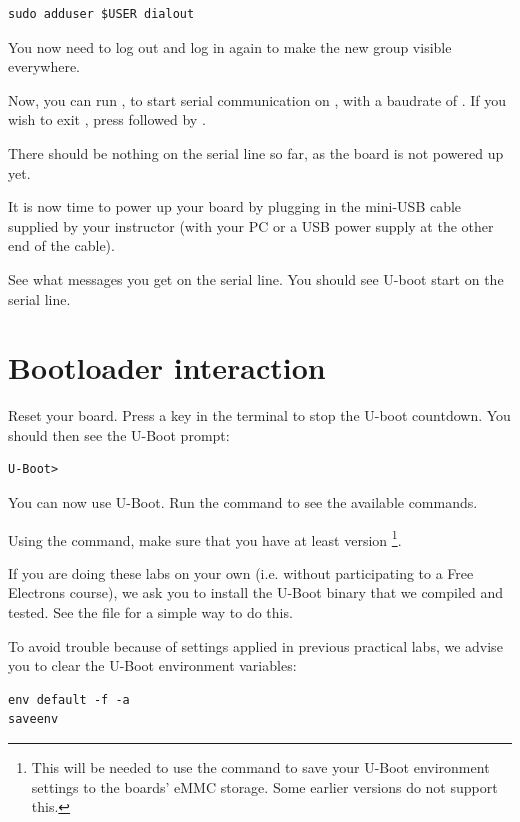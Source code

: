 \begin{verbatim}
sudo adduser $USER dialout
\end{verbatim}

You now need to log out and log in again to make the new group
visible everywhere.

Now, you can run , to start serial
communication on , with a baudrate of . If
you wish to exit , press \code{[Ctrl][a]} followed by
\code{[Ctrl][x]}.

There should be nothing on the serial line so far, as the board is not
powered up yet.

It is now time to power up your board by plugging in the mini-USB
cable supplied by your instructor (with your PC or a USB power supply at the
other end of the cable).

See what messages you get on the serial line. You should see U-boot
start on the serial line.

\section{Bootloader interaction}

Reset your board. Press a key in the  terminal to stop the U-boot
countdown. You should then see the U-Boot prompt:
\begin{verbatim}
U-Boot>
\end{verbatim}

You can now use U-Boot. Run the  command to see the available
commands.

Using the  command, make sure that you have at least version
\footnote{This will be needed to use the  command to
save your U-Boot environment settings to the boards' eMMC storage.
Some earlier versions do not support this.}.

If you are doing these labs on your own (i.e. without participating to a Free Electrons
course), we ask you to install the U-Boot binary that we compiled and
tested. See the 
file for a simple way to do this.

To avoid trouble because of settings applied in previous practical labs,
we advise you to clear the U-Boot environment variables:

\begin{verbatim}
env default -f -a
saveenv
\end{verbatim}

